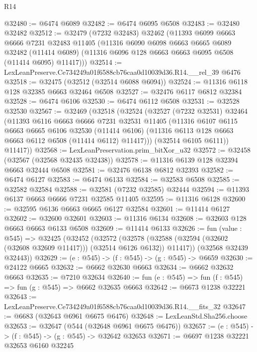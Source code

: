 \begin{lexlean}{R14}
\begin{coremodule}
@32480 := @6474 @6089
@32482 := @6474 @6095 @6508
@32483 := @32480 @32482
@32512 := @32479
    (@7232 @32483)
    @32462
    (@11393
      @6099
      @6663
      @6666
      @7231
      @32483
      @11405
      (@11316
        @6090
        @6098
        @6663
        @6665
        @6089
        @32482
        (@11414 @6089)
        (@11316 @6096 @128 @6663 @6663 @6095 @6508 (@11414 @6095) @11417)))
@32514 := LexLeanPreserve.Ce734249a01f6588cb76caa0d10039d36.R14.__rel_39 @6476
@32518 := @32475 (@32512 (@32514 @6088 @6094))
@32524 := @11316 @6118 @128 @32385 @6663 @32464 @6508
@32527 := @32476 @6117 @6812 @32384
@32528 := @6474 @6106
@32530 := @6474 @6112 @6508
@32531 := @32528 @32530
@32567 := @32469
    (@32518
      (@32524
        (@32527
          (@7232 @32531)
          @32464
          (@11393
            @6116
            @6663
            @6666
            @7231
            @32531
            @11405
            (@11316
              @6107
              @6115
              @6663
              @6665
              @6106
              @32530
              (@11414 @6106)
              (@11316 @6113 @128 @6663 @6663 @6112 @6508 (@11414 @6112) @11417)))
          (@32514 @6105 @6111))
        @11417))
@32568 := LexLeanPreservation.prim_bitXor_u32
@32572 := @32458 (@32567 (@32568 @32435 @32438))
@32578 := @11316 @6139 @128 @32394 @6663 @32444 @6508
@32581 := @32476 @6138 @6812 @32393
@32582 := @6474 @6127
@32583 := @6474 @6133
@32584 := @32583 @6508
@32585 := @32582 @32584
@32588 := @32581 (@7232 @32585) @32444
@32594 := @11393 @6137 @6663 @6666 @7231 @32585 @11405
@32595 := @11316 @6128
@32600 := @32595 @6136 @6663 @6665 @6127 @32584
@32601 := @11414 @6127
@32602 := @32600 @32601
@32603 := @11316 @6134
@32608 := @32603 @128 @6663 @6663 @6133 @6508
@32609 := @11414 @6133
@32626 := fun (value : @545) =>
  @32425
    (@32452
      (@32572
        (@32578 (@32588 (@32594 (@32602 (@32608 @32609 @11417))) (@32514 @6126 @6132)) @11417))
      (@32568 @32439 @32443))
@32629 := (e : @545) -> (f : @545) -> (g : @545) -> @6659
@32630 := @24122 @6665
@32632 := @6662 @32630 @6663
@32634 := @6662 @32632 @6663
@32635 := @7210 @32634
@32640 := fun (e : @545) => fun (f : @545) => fun (g : @545) => @6662 @32635 @6663
@32642 := @6673 @1238 @32221
@32643 := LexLeanPreserve.Ce734249a01f6588cb76caa0d10039d36.R14.__fits_32
@32647 := @6683 (@32643 @6961 @6675 @6476)
@32648 := LexLeanStd.Sha256.choose
@32653 := @32647 (@544 (@32648 @6961 @6675 @6476))
@32657 := (e : @545) -> (f : @545) -> (g : @545) -> @32642 @32653
@32671 := @6697
    @1238
    @32221
    @32653
    @6160
    @32245

\end{coremodule}
\end{lexlean}
